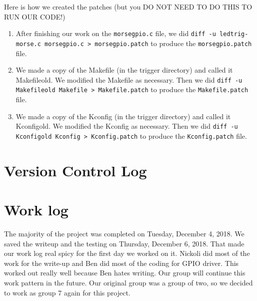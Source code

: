 \documentclass[10pt,english]{article}
\begin{document}
Here is how we created the patches (but you DO NOT NEED TO DO THIS TO RUN OUR CODE!)
\begin{enumerate}
\item After finishing our work on the \verb|morsegpio.c| file, we did \verb|diff -u ledtrig-morse.c morsegpio.c > morsegpio.patch| to produce the \verb|morsegpio.patch| file. 
\item We made a copy of the Makefile (in the trigger directory) and called it Makefileold. We modified the Makefile as necessary. Then we did \verb|diff -u Makefileold Makefile > Makefile.patch| to produce the \verb|Makefile.patch| file.
\item We made a copy of the Kconfig (in the trigger directory) and called it Kconfigold. We modified the Kconfig as necessary. Then we did \verb|diff -u Kconfigold Kconfig > Kconfig.patch| to produce the \verb|Kconfig.patch| file.
\end{enumerate}



\section{Version Control Log}



\section{Work log}

The majority of the project was completed on Tuesday, December 4, 2018. We saved the writeup and the testing on Thursday, December 6, 2018. That made our work log real spicy for the first day we worked on it. Nickoli did most of the work for the write-up and Ben did most of the coding for GPIO driver. This worked out really well because Ben hates writing. Our group will continue this work pattern in the future. Our original group was a group of two, so we decided to work as group 7 again for this project.
 
\end{document}
